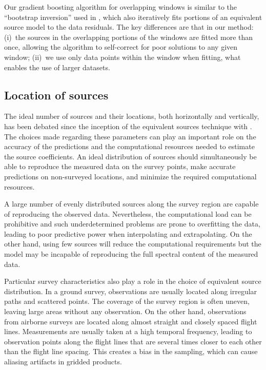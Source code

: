 Our gradient boosting algorithm for overlapping windows is similar to the
``bootstrap inversion'' used in \citet{vonfrese1988}, which also iteratively
fits portions of an equivalent source model to the data residuals.
The key differences are that in our method:
(i)~the sources in the overlapping portions of the windows are fitted more than
once, allowing the algorithm to self-correct for poor solutions to any given
window;
(ii)~we use only data points within the window when fitting, what enables the
use of larger datasets.



\subsection{Location of sources}
\label{sec:source_distribution}

The ideal number of sources and their locations, both horizontally and
vertically, has been debated since the inception of the equivalent sources
technique with \citet{dampney1969}.
The choices made regarding these parameters can play an important role on the
accuracy of the predictions and the computational resources needed to estimate
the source coefficients.
An ideal distribution of sources should simultaneously be able to reproduce the
measured data on the survey points, make accurate predictions on non-surveyed
locations, and minimize the required computational resources.

A large number of evenly distributed sources along the survey region are
capable of reproducing the observed data.
Nevertheless, the computational load can be prohibitive and such
underdetermined problems are prone to overfitting the data, leading to poor
predictive power when interpolating and extrapolating.
On the other hand, using few sources will reduce the computational requirements
but the model may be incapable of reproducing the full spectral content of the
measured data.

Particular survey characteristics also play a role in the choice of equivalent
source distribution.
In a ground survey, observations are usually located along irregular paths and
scattered points.
The coverage of the survey region is often uneven, leaving large areas without
any observation.
On the other hand, observations from airborne surveys are located along almost
straight and closely spaced flight lines.
Measurements are usually taken at a high temporal frequency, leading to
observation points along the flight lines that are several times closer to each
other than the flight line spacing.
This creates a bias in the sampling, which can cause aliasing artifacts in
gridded products.

